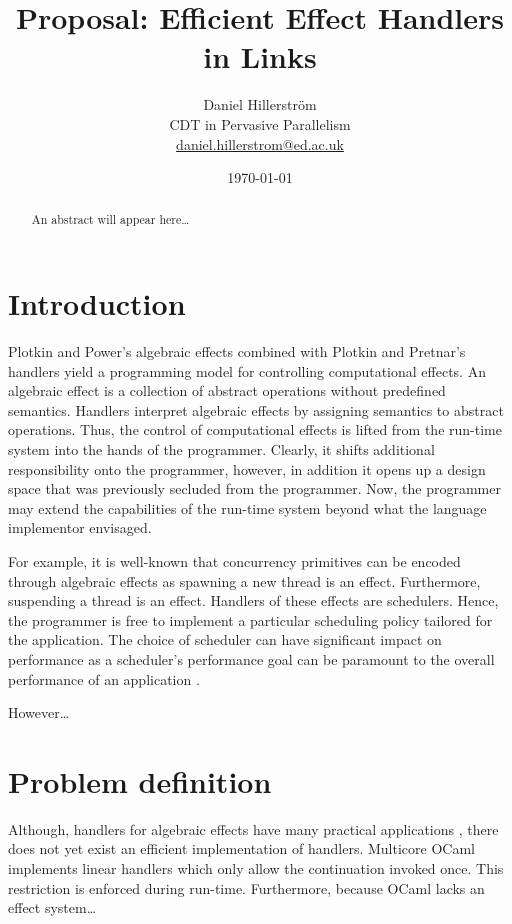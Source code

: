 \documentclass[a4paper,11pt,twoside]{article}
\author{Daniel Hillerström\\\small{CDT in Pervasive Parallelism}\\\small{\href{mailto:daniel.hillerstrom@ed.ac.uk}{daniel.hillerstrom@ed.ac.uk}}}
\date{\today}
\title{Proposal: Efficient Effect Handlers in Links} %
\begin{document}
  \maketitle
  \begin{abstract}
    An abstract will appear here\dots
  \end{abstract}
  \raggedbottom
  \section{Introduction}
  Plotkin and Power's algebraic effects \cite{Plotkin2001} combined with Plotkin and Pretnar's handlers \cite{Plotkin2013} yield a programming model for controlling computational effects. An algebraic effect is a collection of abstract operations without predefined semantics. Handlers interpret algebraic effects by assigning semantics to abstract operations. Thus, the control of computational effects is lifted from the run-time system into the hands of the programmer. Clearly, it shifts additional responsibility onto the programmer, however, in addition it opens up a design space that was previously secluded from the programmer. Now, the programmer may extend the capabilities of the run-time system beyond what the language implementor envisaged.

  For example, it is well-known that concurrency primitives can be encoded through algebraic effects \cite{Bauer2015,Dolan2015} as spawning a new thread is an effect. Furthermore, suspending a thread is an effect. Handlers of these effects are schedulers. Hence, the programmer is free to implement a particular scheduling policy tailored for the application. The choice of scheduler can have significant impact on performance as a scheduler's performance goal can be paramount to the overall performance of an application \cite{Berman2003}.

  However\dots

  \section{Problem definition}
  Although, handlers for algebraic effects have many practical applications \cite{Kammar2013,Bauer2015,Hillerstrom2015,Dolan2015}, there does not yet exist an efficient implementation of handlers. Multicore OCaml implements linear handlers which only allow the continuation invoked once. This restriction is enforced during run-time. Furthermore, because OCaml lacks an effect system\dots
\end{document}
